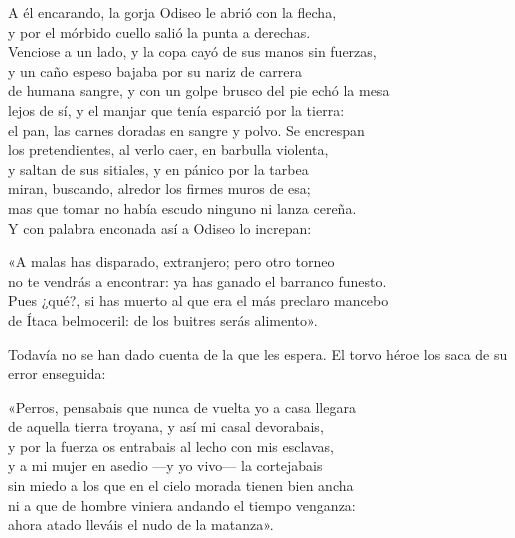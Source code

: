 \begin{versocita}
A él encarando, la gorja Odiseo le abrió con la flecha,\\
y por el mórbido cuello salió la punta a derechas.\\
Venciose a un lado, y la copa cayó de sus manos sin fuerzas,\\
y un caño espeso bajaba por su nariz de carrera\\
de humana sangre, y con un golpe brusco del pie echó la mesa\\
lejos de sí, y el manjar que tenía esparció por la tierra:\\
el pan, las carnes doradas en sangre y polvo. Se encrespan\\
los pretendientes, al verlo caer, en barbulla violenta,\\
y saltan de sus sitiales, y en pánico por la tarbea\\
miran, buscando, alredor los firmes muros de esa;\\
mas que tomar no había escudo ninguno ni lanza cereña.\\
Y con palabra enconada así a Odiseo lo increpan:
\end{versocita}

\begin{versocita}
«A malas has disparado, extranjero; pero otro torneo\\
no te vendrás a encontrar: ya has ganado el barranco funesto.\\
Pues ¿qué?, si has muerto al que era el más preclaro mancebo\\
de Ítaca belmoceril: de los buitres serás alimento».
\end{versocita}

Todavía no se han dado cuenta de la que les espera. El torvo héroe los saca de su error enseguida:

\begin{versocita}
«Perros, pensabais que nunca de vuelta yo a casa llegara\\
de aquella tierra troyana, y así mi casal devorabais,\\
y por la fuerza os entrabais al lecho con mis esclavas,\\
y a mi mujer en asedio ---y yo vivo--- la cortejabais\\
sin miedo a los que en el cielo morada tienen bien ancha\\
ni a que de hombre viniera andando el tiempo venganza:\\
ahora atado lleváis el nudo de la matanza».
\end{versocita}

